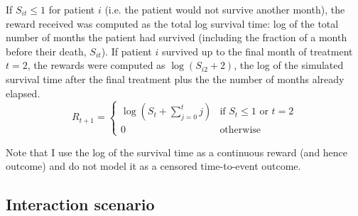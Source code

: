 \documentclass[12pt]{article}
\begin{document}
If $S_{it} \leq 1$ for patient $i$ (i.e. the patient would not survive another month), the reward received was computed as the total log survival time: log of the total number of months the patient had survived (including the fraction of a month before their death, $S_{it}$). If patient $i$ survived up to the final month of treatment $t = 2$, the rewards were computed as $\log(S_{i2} + 2)$, the log of the simulated survival time after the final treatment plus the the number of months already elapsed.
\begin{equation}
  R_{t + 1} = \begin{cases}
    \log(S_{t} + \sum_{j = 0}^{t} j) & \text{if } S_{t} \leq 1 \text{ or } t = 2 \\
    0 & \text{otherwise}
  \end{cases}
\end{equation}

Note that I use the log of the survival time as a continuous reward (and hence outcome) and do not model it as a censored time-to-event outcome.



\subsection{Interaction scenario} %
\label{sub:subgroups_interaction}
\end{document}
